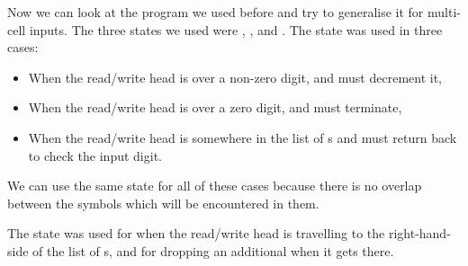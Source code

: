 \begin{center}
\end{center}
        
Now we can look at the program we used before and try to generalise it for multi-cell inputs. The three states we used were , , and . The  state was used in three cases:
\begin{itemize}
    \item When the read/write head is over a non-zero digit, and must decrement it,
    \item When the read/write head is over a zero digit, and must terminate,
    \item When the read/write head is somewhere in the list of s and must return back to check the input digit.
\end{itemize}
We can use the same state for all of these cases because there is no overlap between the symbols which will be encountered in them.

The  state was used for when the read/write head is travelling to the right-hand-side of the list of s, and for dropping an additional  when it gets there.

